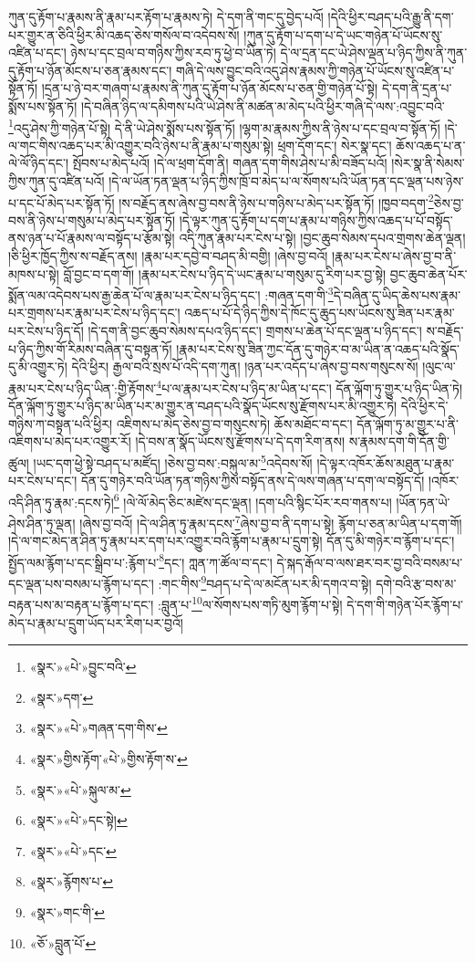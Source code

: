 ཀུན་དུ་རྟོག་པ་རྣམས་ནི་རྣམ་པར་རྟོག་པ་རྣམས་ཏེ། དེ་དག་ནི་གང་དུ་བྱེད་པའོ། །དེའི་ཕྱིར་བཤད་པའི་རྒྱུ་ནི་དག་པར་གྱུར་ན་ཅིའི་ཕྱིར་མི་འཆད་ཅེས་གསོལ་བ་འདེབས་སོ། །ཀུན་དུ་རྟོག་པ་དག་པ་དེ་ཡང་གཉེན་པོ་ཡོངས་སུ་འཛིན་པ་དང་། ཉེས་པ་དང་བྲལ་བ་གཉིས་ཀྱིས་རབ་ཏུ་ཕྱེ་བ་ཡིན་ཏེ། དེ་ལ་དྲན་དང་ཡེ་ཤེས་ལྡན་པ་ཉིད་ཀྱིས་ནི་ཀུན་དུ་རྟོག་པ་ཉོན་མོངས་པ་ཅན་རྣམས་དང་། གཞི་དེ་ལས་བྱུང་བའི་འདུ་ཤེས་རྣམས་ཀྱི་གཉེན་པོ་ཡོངས་སུ་འཛིན་པ་སྟོན་ཏོ། །དྲན་པ་ཉེ་བར་གཞག་པ་རྣམས་ནི་ཀུན་དུ་རྟོག་པ་ཉོན་མོངས་པ་ཅན་གྱི་གཉེན་པོ་སྟེ། དེ་དག་ནི་དྲན་པ་སྨོས་པས་སྟོན་ཏོ། །དེ་བཞིན་ཉིད་ལ་དམིགས་པའི་ཡེ་ཤེས་ནི་མཚན་མ་མེད་པའི་ཕྱིར་གཞི་དེ་ལས་:འབྱུང་བའི་\footnote{«སྣར་»«པེ་»བྱུང་བའི་}འདུ་ཤེས་ཀྱི་གཉེན་པོ་སྟེ། དེ་ནི་ཡེ་ཤེས་སྨོས་པས་སྟོན་ཏོ། །ལྷག་མ་རྣམས་ཀྱིས་ནི་ཉེས་པ་དང་བྲལ་བ་སྟོན་ཏོ། །དེ་ལ་གང་གིས་འཆད་པར་མི་འགྱུར་བའི་ཉེས་པ་ནི་རྣམ་པ་གསུམ་སྟེ། ཕྲག་དོག་དང་། སེར་སྣ་དང་། ཆོས་འཆད་པ་ན་ལེ་ལོ་ཉིད་དང་། སྤོབས་པ་མེད་པའོ། །དེ་ལ་ཕྲག་དོག་ནི། གཞན་དག་གིས་ཤེས་པ་མི་བཟོད་པའོ། །སེར་སྣ་ནི་སེམས་ཀྱིས་ཀུན་དུ་འཛིན་པའོ། །དེ་ལ་ཡོན་ཏན་ལྡན་པ་ཉིད་ཀྱིས་ཁྲོ་བ་མེད་པ་ལ་སོགས་པའི་ཡོན་ཏན་དང་ལྡན་པས་ཉེས་པ་དང་པོ་མེད་པར་སྟོན་ཏོ། །ས་བརྗོད་ནས་ཞེས་བྱ་བས་ནི་ཉེས་པ་གཉིས་པ་མེད་པར་སྟོན་ཏོ། །ཁྱབ་བདག་\footnote{«སྣར་»དག་}ཅེས་བྱ་བས་ནི་ཉེས་པ་གསུམ་པ་མེད་པར་སྟོན་ཏོ། །དེ་ལྟར་ཀུན་དུ་རྟོག་པ་དག་པ་རྣམ་པ་གཉིས་ཀྱིས་འཆད་པ་པོ་བསྟོད་ནས་ཉན་པ་པོ་རྣམས་ལ་བསྟོད་པ་རྩོམ་སྟེ། འདི་ཀུན་རྣམ་པར་ངེས་པ་སྟེ། །བྱང་ཆུབ་སེམས་དཔའ་གྲགས་ཆེན་ལྡན། །ཅི་ཕྱིར་ཁྱོད་ཀྱིས་ས་བརྗོད་ནས། །རྣམ་པར་དབྱེ་བ་བཤད་མི་བགྱི། །ཞེས་བྱ་བའོ། །རྣམ་པར་ངེས་པ་ཞེས་བྱ་བ་ནི་མཁས་པ་སྟེ། བློ་བྱང་བ་དག་གོ། །རྣམ་པར་ངེས་པ་ཉིད་དེ་ཡང་རྣམ་པ་གསུམ་དུ་རིག་པར་བྱ་སྟེ། བྱང་ཆུབ་ཆེན་པོར་སྨོན་ལམ་འདེབས་པས་རྒྱ་ཆེན་པོ་ལ་རྣམ་པར་ངེས་པ་ཉིད་དང་། :གཞན་དག་གི་\footnote{«སྣར་»«པེ་»གཞན་དག་གིས་}དེ་བཞིན་དུ་ཡིད་ཆེས་པས་རྣམ་པར་གྲགས་པར་རྣམ་པར་ངེས་པ་ཉིད་དང་། འཆད་པ་པོ་དེ་ཉིད་ཀྱིས་དེ་ཁོང་དུ་ཆུད་པས་ཡོངས་སུ་ཟིན་པར་རྣམ་པར་ངེས་པ་ཉིད་དོ། །དེ་དག་ནི་བྱང་ཆུབ་སེམས་དཔའ་ཉིད་དང་། གྲགས་པ་ཆེན་པོ་དང་ལྡན་པ་ཉིད་དང་། ས་བརྗོད་པ་ཉིད་ཀྱིས་གོ་རིམས་བཞིན་དུ་བསྟན་ཏོ། །རྣམ་པར་ངེས་སུ་ཟིན་ཀྱང་དོན་དུ་གཉེར་བ་མ་ཡིན་ན་འཆད་པའི་སྣོད་དུ་མི་འགྱུར་ཏེ། དེའི་ཕྱིར། རྒྱལ་བའི་སྲས་པོ་འདི་དག་ཀུན། །ཉན་པར་འདོད་པ་ཞེས་བྱ་བས་གསུངས་སོ། །ལུང་ལ་རྣམ་པར་ངེས་པ་ཉིད་ཡིན་:གྱི་རྟོགས་\footnote{«སྣར་»གྱིས་རྟོག་«པེ་»གྱིས་རྟོག་ས་}པ་ལ་རྣམ་པར་ངེས་པ་ཉིད་མ་ཡིན་པ་དང་། དོན་ལྐོག་ཏུ་གྱུར་པ་ཉིད་ཡིན་ཏེ། དོན་ལྐོག་ཏུ་གྱུར་པ་ཉིད་མ་ཡིན་པར་མ་གྱུར་ན་བཤད་པའི་སྣོད་ཡོངས་སུ་རྫོགས་པར་མི་འགྱུར་ཏེ། དེའི་ཕྱིར་དེ་གཉིས་ཀ་བསྟན་པའི་ཕྱིར། འཇིགས་པ་མེད་ཅེས་བྱ་བ་གསུངས་ཏེ། ཆོས་མཐོང་བ་དང་། དོན་ལྐོག་ཏུ་མ་གྱུར་པ་ནི་འཇིགས་པ་མེད་པར་འགྱུར་རོ། །དེ་བས་ན་སྣོད་ཡོངས་སུ་རྫོགས་པ་དེ་དག་རིག་ནས། ས་རྣམས་དག་གི་དོན་གྱི་ཚུལ། །ཡང་དག་ཕྱེ་སྟེ་བཤད་པ་མཛོད། །ཅེས་བྱ་བས་:བསྐུལ་མ་\footnote{«སྣར་»«པེ་»སྐུལ་མ་}འདེབས་སོ། །དེ་ལྟར་འཁོར་ཆོས་མཐུན་པ་རྣམ་པར་ངེས་པ་དང་། དོན་དུ་གཉེར་བའི་ཡོན་ཏན་གཉིས་ཀྱིས་བསྟོད་ནས་དེ་ལས་གཞན་པ་དག་ལ་བསྟོད་དོ། །འཁོར་འདི་ཤིན་ཏུ་རྣམ་:དངས་ཏེ།\footnote{«སྣར་»«པེ་»དང་སྟེ།} །ལེ་ལོ་མེད་ཅིང་མཛེས་དང་ལྡན། །དག་པའི་སྙིང་པོར་རབ་གནས་པ། །ཡོན་ཏན་ཡེ་ཤེས་ཤིན་ཏུ་ལྡན། །ཞེས་བྱ་བའོ། །དེ་ལ་ཤིན་ཏུ་རྣམ་དངས་\footnote{«སྣར་»«པེ་»དང་}ཞེས་བྱ་བ་ནི་དག་པ་སྟེ། རྙོག་པ་ཅན་མ་ཡིན་པ་དག་གོ། །དེ་ལ་གང་མེད་ན་ཤིན་ཏུ་རྣམ་པར་དག་པར་འགྱུར་བའི་རྙོག་པ་རྣམ་པ་དྲུག་སྟེ། དོན་དུ་མི་གཉེར་བ་རྙོག་པ་དང་། སྤྱོད་ལམ་རྙོག་པ་དང་སྒྲིབ་པ་:རྙོག་པ་\footnote{«སྣར་»རྙོགས་པ་}དང་། ཀླན་ཀ་ཚོལ་བ་དང་། དེ་སྐད་རྒོལ་བ་ལས་ཐར་བར་བྱ་བའི་བསམ་པ་དང་ལྡན་པས་བསམ་པ་རྙོག་པ་དང་། :གང་གིས་\footnote{«སྣར་»གང་གི་}བཤད་པ་དེ་ལ་མངོན་པར་མི་དགའ་བ་སྟེ། དགེ་བའི་རྩ་བས་མ་བརྟན་པས་མ་བརྟན་པ་རྙོག་པ་དང་། :བླུན་པ་\footnote{«ཅོ་»བླུན་པོ་}ལ་སོགས་པས་གཏི་མུག་རྙོག་པ་སྟེ། དེ་དག་གི་གཉེན་པོར་རྙོག་པ་མེད་པ་རྣམ་པ་དྲུག་ཡོད་པར་རིག་པར་བྱའོ། 